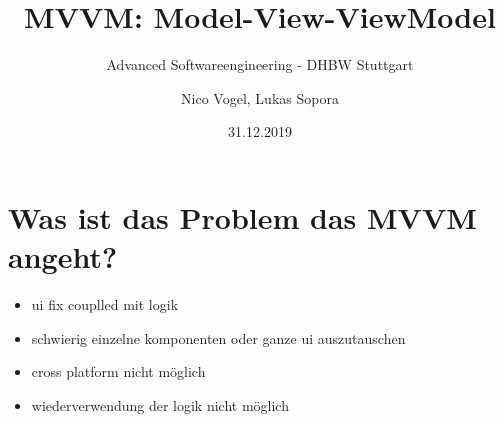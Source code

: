 \documentclass[titlepage=false,12pt]{scrreprt}
\title{MVVM: Model-View-ViewModel}
\subtitle{Advanced Softwareengineering - DHBW Stuttgart}
\author{Nico Vogel, Lukas Sopora}
\date{31.12.2019}
\begin{document}
	\maketitle
	{\renewcommand\clearpage\relax
		\tableofcontents}
	\newpage


	\chapter{Was ist das Problem das MVVM angeht?}
	\begin{itemize}
		\item ui fix couplled mit logik
		\item schwierig einzelne komponenten oder ganze ui auszutauschen
		\item cross platform nicht möglich
		\item wiederverwendung der logik nicht möglich
	\end{itemize}
\end{document}
